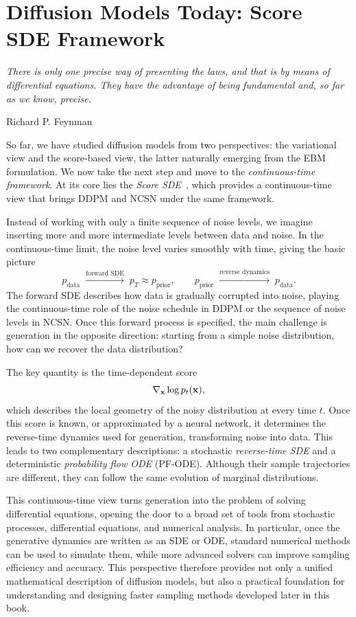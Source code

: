 \chapter{Diffusion Models Today: Score SDE Framework}\label{ch:score-sde}

\epigraph{
    \textit{There is only one precise way of presenting the laws, and that is by means of differential equations. They have the advantage of being fundamental and, so far as we know, precise.
}}{Richard P. Feynman}



So far, we have studied diffusion models from two perspectives: the variational
view and the score-based view, the latter naturally emerging from the EBM
formulation. We now take the next step and move to the \emph{continuous-time
framework}. At its core lies the \emph{Score SDE}~\citep{song2020score}, which
provides a continuous-time view that brings DDPM and NCSN under the same
framework.

Instead of working with only a finite sequence of noise levels, we imagine
inserting more and more intermediate levels between data and noise. In the
continuous-time limit, the noise level varies smoothly with time, giving the
basic picture
\[
    p_{\mathrm{data}}
    \;\xrightarrow{\text{forward SDE}}\;
    p_T \approx p_{\mathrm{prior}},
    \qquad
    p_{\mathrm{prior}}
    \;\xrightarrow{\text{reverse dynamics}}\;
    p_{\mathrm{data}}.
\]
The forward SDE describes how data is gradually corrupted into noise, playing
the continuous-time role of the noise schedule in DDPM or the sequence of noise
levels in NCSN. Once this forward process is specified, the main challenge is
generation in the opposite direction: starting from a simple noise distribution,
how can we recover the data distribution?

The key quantity is the time-dependent score
\[
    \nabla_{{\mathbf{x}}}\log p_t({\mathbf{x}}),
\]
which describes the local geometry of the noisy distribution at every time
$t$. Once this score is known, or approximated by a neural network, it determines the reverse-time dynamics used for generation, transforming noise into data. This leads to two complementary
descriptions: a stochastic \emph{reverse-time SDE} and a deterministic
\emph{probability flow ODE} (PF-ODE). Although their sample trajectories are
different, they can follow the same evolution of marginal distributions.

This continuous-time view turns generation into the problem of solving
differential equations, opening the door to a broad set of tools from stochastic
processes, differential equations, and numerical analysis. In particular, once
the generative dynamics are written as an SDE or ODE, standard numerical
methods can be used to simulate them, while more advanced solvers can improve
sampling efficiency and accuracy. This perspective therefore provides not only
a unified mathematical description of diffusion models, but also a practical
foundation for understanding and designing faster sampling methods developed
later in this book.

